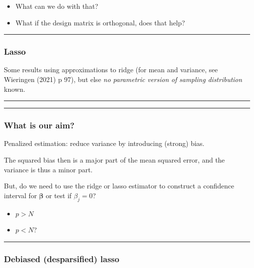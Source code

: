 \documentclass[
  letterpaper,
  DIV=11,
  numbers=noendperiod]{scrartcl}
\providecommand{\tightlist}{%
  \setlength{\itemsep}{0pt}\setlength{\parskip}{0pt}}\usepackage{longtable,booktabs,array}
\begin{document}
\begin{itemize}
\tightlist
\item
  What can we do with that?
\item
  What if the design matrix is orthogonal, does that help?
\end{itemize}

\begin{center}\rule{0.5\linewidth}{0.5pt}\end{center}

\hypertarget{lasso}{%
\subsubsection{Lasso}\label{lasso}}

Some results using approximations to ridge (for mean and variance, see
Wieringen (2021) p 97), but else \emph{no parametric version of sampling
distribution} known.

\begin{center}\rule{0.5\linewidth}{0.5pt}\end{center}

\begin{center}\rule{0.5\linewidth}{0.5pt}\end{center}

\hypertarget{what-is-our-aim}{%
\subsubsection{What is our aim?}\label{what-is-our-aim}}

Penalized estimation: reduce variance by introducing (strong) bias.

The squared bias then is a major part of the mean squared error, and the
variance is thus a minor part.

But, do we need to use the ridge or lasso estimator to construct a
confidence interval for \(\boldsymbol \beta\) or test if \(\beta_j=0\)?

\begin{itemize}
\tightlist
\item
  \(p>N\)
\item
  \(p<N\)?
\end{itemize}

\begin{center}\rule{0.5\linewidth}{0.5pt}\end{center}

\hypertarget{debiased-desparsified-lasso}{%
\subsubsection{Debiased (desparsified)
lasso}\label{debiased-desparsified-lasso}}
\end{document}
